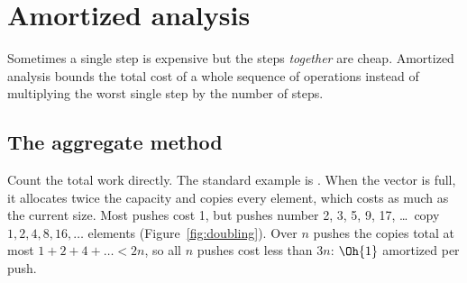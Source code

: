 \section[Amortized analysis]{Amortized analysis \hfill \gold}\label{sec:amortized}

Sometimes a single step is expensive but the steps \emph{together} are cheap. Amortized analysis bounds the total cost of a
whole sequence of operations instead of multiplying the worst single step by the number of steps.

\subsection{The aggregate method}

Count the total work directly. The standard example is . When the vector is full, it allocates twice
the capacity and copies every element, which costs as much as the current size. Most pushes cost 1, but pushes number 2, 3,
5, 9, 17, \ldots\ copy $1, 2, 4, 8, 16, \ldots$ elements (Figure~\ref{fig:doubling}). Over $n$ pushes the copies total at
most $1 + 2 + 4 + \dots < 2n$, so all $n$ pushes cost less than $3n$: $\Oh{1}$ amortized per push.

